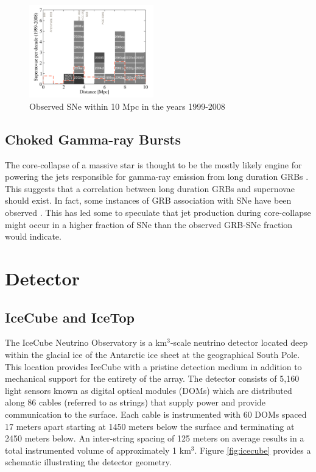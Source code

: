 \documentclass{gatech-thesis}
\begin{document}
\begin{figure}
  \begin{center}
    \includegraphics[width=0.48\textwidth,keepaspectratio]{NearbySNCatalogue.png}
  \end{center}
  \caption{Observed SNe within 10 Mpc in the years 1999-2008 \cite{2011PhRvD..83l3008K}}
  \label{fig:local_ccsne}
\end{figure}

\section{Choked Gamma-ray Bursts}
The core-collapse of a massive star is thought to be the mostly likely engine for powering the jets responsible for gamma-ray emission from long duration GRBs \cite{}. This suggests that a correlation between long duration GRBs and supernovae should exist. In fact, some instances of GRB association with SNe have been observed \cite{} \cite{}. This has led some to speculate that jet production during core-collapse might occur in a higher fraction of SNe than the observed GRB-SNe fraction would indicate.


\chapter{Detector}
\section{IceCube and IceTop}
The IceCube Neutrino Observatory is a km$^{3}$-scale neutrino detector located deep within the glacial ice of the Antarctic ice sheet at the geographical South Pole. This location provides IceCube with a pristine detection medium in addition to mechanical support for the entirety of the array. The detector consists of 5,160 light sensors known as digital optical modules (DOMs) which are distributed along 86 cables (referred to as strings) that supply power and provide communication to the surface. Each cable is instrumented with 60 DOMs spaced 17 meters apart starting at 1450 meters below the surface and terminating at 2450 meters below. An inter-string spacing of 125 meters on average results in a total instrumented volume of approximately 1 km$^{3}$. Figure \ref{fig:icecube} provides a schematic illustrating the detector geometry.
\end{document}

